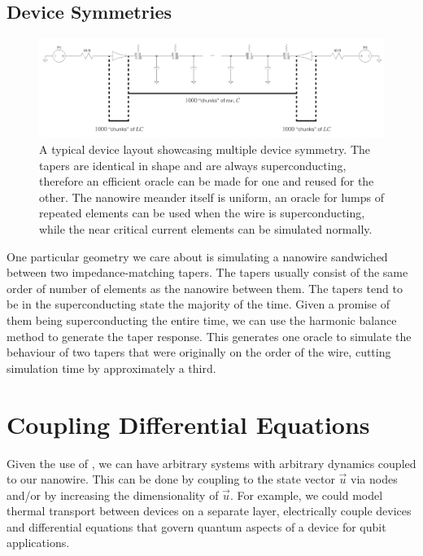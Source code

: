 \subsection{Device Symmetries}

\begin{figure}
    \centering
    \includegraphics[width=\textwidth]{figs/juliasimsymmetry.png}
    \caption{A typical device layout showcasing multiple device symmetry. The tapers are identical in
    shape and are always superconducting, therefore an efficient oracle can be made for one and reused 
    for the other. The nanowire meander itself is uniform, an oracle for lumps of repeated elements can 
    be used when the wire is superconducting, while the near critical current elements can be simulated
    normally.}
    \label{fig:juliasimsymmetry}
\end{figure}

One particular geometry we care about is simulating a nanowire sandwiched between two impedance-matching tapers.
The tapers usually consist of the same order of number of elements as the nanowire between them. The tapers
tend to be in the superconducting state the majority of the time. Given a promise of them being superconducting
the entire time, we can use the harmonic balance method to generate the taper response. This generates one oracle
to simulate the behaviour of two tapers that were originally on the order of the wire, cutting simulation time by
approximately a third.

\section{Coupling Differential Equations}

Given the use of , we can have arbitrary systems with arbitrary dynamics
coupled to our nanowire. This can be done by coupling to the state vector $\vec u$ via nodes and/or
by increasing the dimensionality of $\vec u$. For example, we could model thermal transport between
devices on a separate layer, electrically couple devices and differential
equations that govern quantum aspects of a device for qubit applications.

